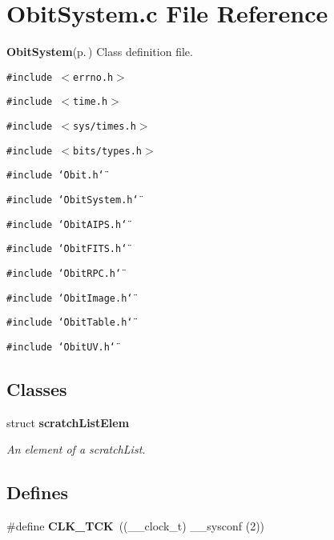 \section{Obit\-System.c File Reference}
\label{ObitSystem_8c}
{\bf Obit\-System}{\rm (p.\,\pageref{structObitSystem})} Class definition file. 

{\tt \#include $<$errno.h$>$}\par
{\tt \#include $<$time.h$>$}\par
{\tt \#include $<$sys/times.h$>$}\par
{\tt \#include $<$bits/types.h$>$}\par
{\tt \#include \char`\"{}Obit.h\char`\"{}}\par
{\tt \#include \char`\"{}Obit\-System.h\char`\"{}}\par
{\tt \#include \char`\"{}Obit\-AIPS.h\char`\"{}}\par
{\tt \#include \char`\"{}Obit\-FITS.h\char`\"{}}\par
{\tt \#include \char`\"{}Obit\-RPC.h\char`\"{}}\par
{\tt \#include \char`\"{}Obit\-Image.h\char`\"{}}\par
{\tt \#include \char`\"{}Obit\-Table.h\char`\"{}}\par
{\tt \#include \char`\"{}Obit\-UV.h\char`\"{}}\par
\subsection*{Classes}
\begin{CompactItemize}
\item 
struct {\bf scratch\-List\-Elem}
\begin{CompactList}\small\item\em An element of a scratch\-List. \item\end{CompactList}\end{CompactItemize}
\subsection*{Defines}
\begin{CompactItemize}
\item 
\#define {\bf CLK\_\-TCK}\ ((\_\-\_\-clock\_\-t) \_\-\_\-sysconf (2))
\end{CompactItemize}
